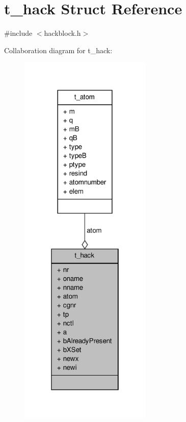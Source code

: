 \hypertarget{structt__hack}{\section{t\-\_\-hack \-Struct \-Reference}
\label{structt__hack}
}


{\ttfamily \#include $<$hackblock.\-h$>$}



\-Collaboration diagram for t\-\_\-hack\-:
\nopagebreak
\begin{figure}[H]
\begin{center}
\leavevmode
\includegraphics[width=178pt]{structt__hack__coll__graph}
\end{center}
\end{figure}
